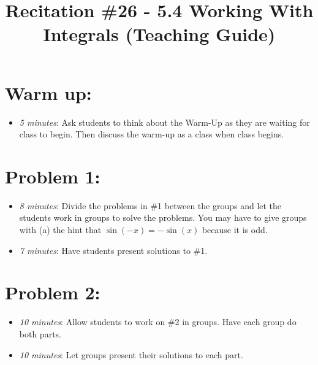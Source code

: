 \documentclass[handout,nooutcomes]{ximera}
\title{Recitation \#26 - 5.4 Working With Integrals (Teaching Guide)}
\begin{document}
\begin{abstract}		\end{abstract}
\maketitle


\section*{Warm up:} 
	
	\begin{itemize}
	
	\item  \emph{5 minutes}:  Ask students to think about the Warm-Up as they are waiting for class to begin.  Then discuss the warm-up as a class when class begins.
	
	
	
	\end{itemize}


\section*{Problem 1:}

	\begin{itemize}
	
	\item  \emph{8 minutes}:  Divide the problems in \#1 between the groups and let the students work in groups to solve the problems.  You may have to give groups with (a) the hint that $\sin (-x)=-\sin (x)$ because it is odd.
	
	\item  \emph{7 minutes}:  Have students present solutions to \#1.
	
	\end{itemize}



\section*{Problem 2:}

	\begin{itemize}
	
	\item  \emph{10 minutes}:  Allow students to work on \#2 in groups.  Have each group do both parts.
		
	\item  \emph{10 minutes}:  Let groups present their solutions to each part.
			
	\end{itemize}
	
\end{document}
